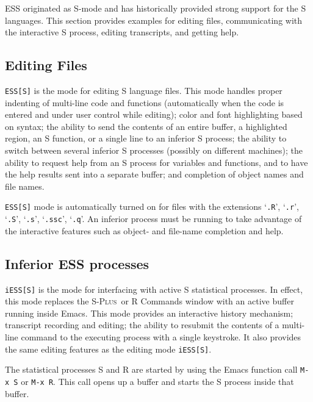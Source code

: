 \documentclass{article}
\newcommand*{\Splus}{\textsc{S-Plus}}
\newcommand{\stexttt}[1]{{\small\texttt{#1}}}
\newcommand{\file}[1]{`\stexttt{#1}'}
\begin{document}
ESS originated as S-mode and has historically provided strong support
for the S languages.  This section provides examples for editing
files, communicating with the interactive S process, editing
transcripts, and getting help.

\subsection{Editing Files}
\label{sec:S:edit}

\stexttt{ESS[S]} is the mode for editing S language files.  This mode
handles proper indenting of multi-line code and functions
(automatically when the code is entered and under user control while
editing); color and font highlighting based on syntax; the ability to
send the contents of an entire buffer, a highlighted region, an S
function, or a single line to an inferior S process; the ability to
switch between several inferior S processes (possibly on different
machines); the ability to request help from an S process for variables
and functions, and to have the help results sent into a separate
buffer; and completion of object names and file names.

\stexttt{ESS[S]} mode is automatically turned on for files with the
extensions \file{.R}, \file{.r}, \file{.S}, \file{.s}, \file{.ssc},
\file{.q}.  An inferior process must be running to take advantage of
the interactive features such as object- and file-name completion and
help.

\subsection{Inferior ESS processes}
\label{sec:S:inf}

\stexttt{iESS[S]} is the mode for interfacing with active S
statistical processes.  In effect, this mode replaces the \Splus\ or R
Commands window with an active buffer running inside Emacs.  This mode
provides an interactive history mechanism; transcript recording and
editing; the ability to resubmit the contents of a multi-line command
to the executing process with a single keystroke.  It also provides
the same editing features as the editing mode \stexttt{iESS[S]}.

The statistical processes S and R are started by using the Emacs
function call \stexttt{M-x~S} or \stexttt{M-x~R}.  This call opens up
a buffer and starts the S process inside that buffer.
\end{document}
